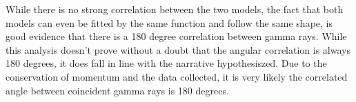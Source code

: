 \documentclass[../final_report_main.tex]{subfiles}
\begin{document}
While there is no strong correlation between the two models, the fact that
both models can even be fitted by the same function and follow the same shape,
is good evidence that there is a 180 degree correlation between gamma rays.
While this analysis doesn't prove without a doubt that the angular correlation
is always 180 degrees, it does fall in line with the narrative hypothesiszed.
Due to the conservation of momentum and the data collected, it is very likely
the correlated angle between coincident gamma rays is 180 degrees.
\end{document}

